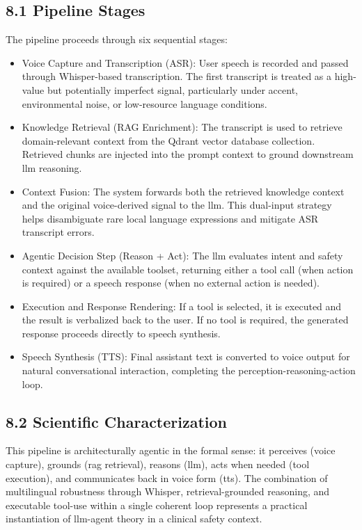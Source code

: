 \documentclass[11pt,a4paper]{article}
\begin{document}
\subsection{8.1 Pipeline Stages}
The pipeline proceeds through six sequential stages:
\begin{itemize}[leftmargin=1.4em]
  \item Voice Capture and Transcription (ASR): User speech is recorded and passed through Whisper-based transcription. The first transcript is treated as a high-value but potentially imperfect signal, particularly under accent, environmental noise, or low-resource language conditions.
  \item Knowledge Retrieval (RAG Enrichment): The transcript is used to retrieve domain-relevant context from the Qdrant vector database collection. Retrieved chunks are injected into the prompt context to ground downstream \gls{llm} reasoning.
  \item Context Fusion: The system forwards both the retrieved knowledge context and the original voice-derived signal to the \gls{llm}. This dual-input strategy helps disambiguate rare local language expressions and mitigate ASR transcript errors.
  \item Agentic Decision Step (Reason + Act): The \gls{llm} evaluates intent and safety context against the available toolset, returning either a tool call (when action is required) or a speech response (when no external action is needed).
  \item Execution and Response Rendering: If a tool is selected, it is executed and the result is verbalized back to the user. If no tool is required, the generated response proceeds directly to speech synthesis.
  \item Speech Synthesis (TTS): Final assistant text is converted to voice output for natural conversational interaction, completing the perception-reasoning-action loop.
\end{itemize}

\subsection{8.2 Scientific Characterization}
This pipeline is architecturally agentic in the formal sense: it perceives (voice capture), grounds (\gls{rag} retrieval), reasons (\gls{llm}), acts when needed (tool execution), and communicates back in voice form (\gls{tts}). The combination of multilingual robustness through Whisper, retrieval-grounded reasoning, and executable tool-use within a single coherent loop represents a practical instantiation of \gls{llm}-agent theory in a clinical safety context.
\end{document}
